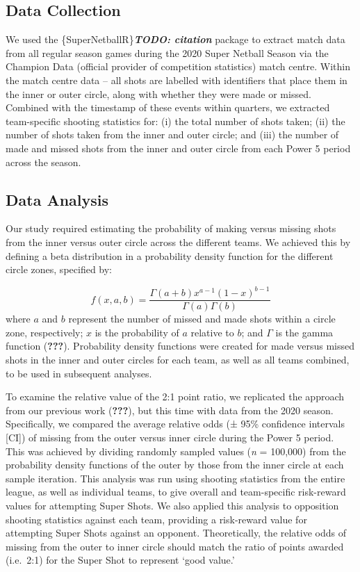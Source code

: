 \documentclass[]{elsarticle} %
\begin{document}
\hypertarget{data-collection}{%
\subsection{Data Collection}\label{data-collection}}

We used the \{SuperNetballR\}\textbf{\emph{TODO: citation}} package to
extract match data from all regular season games during the 2020 Super
Netball Season via the Champion Data (official provider of competition
statistics) match centre. Within the match centre data -- all shots are
labelled with identifiers that place them in the inner or outer circle,
along with whether they were made or missed. Combined with the timestamp
of these events within quarters, we extracted team-specific shooting
statistics for: (i) the total number of shots taken; (ii) the number of
shots taken from the inner and outer circle; and (iii) the number of
made and missed shots from the inner and outer circle from each Power 5
period across the season.

\hypertarget{data-analysis}{%
\subsection{Data Analysis}\label{data-analysis}}

Our study required estimating the probability of making versus missing
shots from the inner versus outer circle across the different teams. We
achieved this by defining a beta distribution in a probability density
function for the different circle zones, specified by:

\[f(x,a,b) = \frac{\Gamma(a+b)x^{a-1}(1-x)^{b-1}}{\Gamma(a)\Gamma(b)} \]
where \(a\) and \(b\) represent the number of missed and made shots
within a circle zone, respectively; \(x\) is the probability of \(a\)
relative to \(b\); and \(\Gamma\) is the gamma function
({\textbf{???}}). Probability density functions were created for made
versus missed shots in the inner and outer circles for each team, as
well as all teams combined, to be used in subsequent analyses.

To examine the relative value of the 2:1 point ratio, we replicated the
approach from our previous work ({\textbf{???}}), but this time with
data from the 2020 season. Specifically, we compared the average
relative odds (± 95\% confidence intervals {[}CI{]}) of missing from the
outer versus inner circle during the Power 5 period. This was achieved
by dividing randomly sampled values (\emph{n} = 100,000) from the
probability density functions of the outer by those from the inner
circle at each sample iteration. This analysis was run using shooting
statistics from the entire league, as well as individual teams, to give
overall and team-specific risk-reward values for attempting Super Shots.
We also applied this analysis to opposition shooting statistics against
each team, providing a risk-reward value for attempting Super Shots
against an opponent. Theoretically, the relative odds of missing from
the outer to inner circle should match the ratio of points awarded
(i.e.~2:1) for the Super Shot to represent `good value.'
\end{document}
